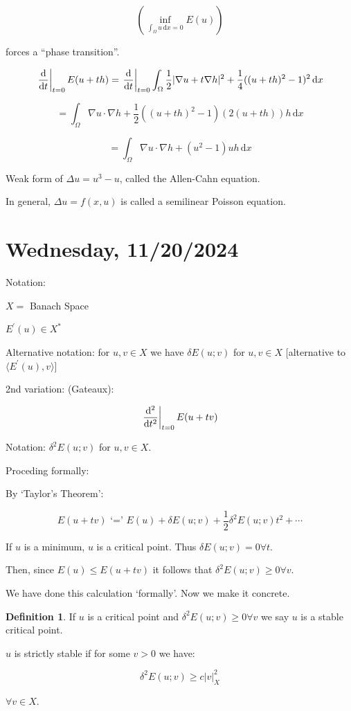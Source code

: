 \documentclass{article}
\theoremstyle{definition}
\newtheorem{definition}{Definition}
\begin{document}
\begin{enumerate}[label=\roman*)]
    \[
        \left( \inf_{\int_{\Omega} u \,\mathrm{d}x = 0} E(u) \right) 
    \]

    forces a ``phase transition''.

    \[
        \eval{\frac{\mathrm{d}}{\mathrm{d}t}}_{t=0} E(u+th) = \eval{\frac{\mathrm{d}}{\mathrm{d}t}}_{t=0} \int_{\Omega} \frac{1}{2} \vert \nabla u + t \nabla h \vert^2 + \frac{1}{4} ((u+th)^2 - 1)^2 \,\mathrm{d}x 
    \]

    \[
        = \int_{\Omega} \nabla u \cdot \nabla h + \frac{1}{2}((u+th)^2 - 1)(2(u+th))h \,\mathrm{d}x 
    \]

    \[
        = \int_{\Omega} \nabla u \cdot \nabla h + (u^2 - 1)uh \,\mathrm{d}x 
    \]

    Weak form of \(\Delta u = u^3 - u\), called the Allen-Cahn equation.

    In general, \(\Delta u = f(x,u)\) is called a semilinear Poisson equation.

\end{enumerate} 

\section*{Wednesday, 11/20/2024}

Notation:

\(X =\) Banach Space

\(E^{\prime} (u) \in X^{\ast}\) 

Alternative notation: for \(u,v\in X\) we have \(\delta E(u;v)\) for \(u,v\in X\) [alternative to \(\langle E^{\prime} (u), v \rangle\)]

2nd variation: (Gateaux):

\[
    \eval{\frac{\mathrm{d}^2}{\mathrm{d}t^2}}_{t=0}E(u+tv)
\]

Notation: \(\delta^2 E(u;v)\) for \(u,v\in X\).

Proceding formally:

By `Taylor's Theorem':

\[
    E(u+tv) \text{ `=' } E(u) + \delta E(u;v) + \frac{1}{2} \delta^2 E(u;v)t^2 + \cdots 
\]

If \(u\) is a minimum, \(u\) is a critical point. Thus \(\delta E(u;v) = 0 \forall t\).

Then, since \(E(u) \leq E(u+tv)\) it follows that \(\delta^2 E(u;v) \geq 0 \forall v\).

We have done this calculation `formally'. Now we make it concrete.

\begin{definition}
    If \(u\) is a critical point and \(\delta^2 E(u;v) \geq 0 \forall v\) we say \(u\) is a stable critical point.

    \(u\) is strictly stable if for some \(v > 0\) we have:

    \[
        \delta^2 E(u;v) \geq c \vert v \vert_X^2
    \]

    \(\forall v\in X\).
\end{definition}
\end{document}
